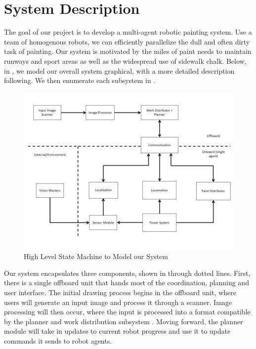 
\section{System Description}
\label{sec:system_description}

The goal of our project is to develop a multi-agent robotic painting system. Use a team of homogenous robots, we can efficiently parallelize the dull and often dirty task of painting. Our system is motivated by the miles of paint needs to maintain runways and sport areas as well as the widespread use of sidewalk chalk. Below, in , we model our overall system graphical, with a more detailed description following. We then enumerate each subsystem in .

\begin{figure}[h!]
 \centering
  \includegraphics[width=0.90\columnwidth]{diagrams/systems_diagram.jpg}
	\caption{High Level State Machine to Model our System}
 \label{fig:system_description}
\end{figure}

Our system encapsulates three components, shown in  through dotted lines. First, there is a single offboard unit that hands most of the coordination, planning and user interface. The initial drawing process begins in the offboard unit, where users will generate an input image and process it through a scanner. Image processing will then occur, where the input is processed into a format compatible by the planner and work distribution subsystem . Moving forward, the planner module will take in updates to current robot progress and use it to update commands it sends to robot agents.

